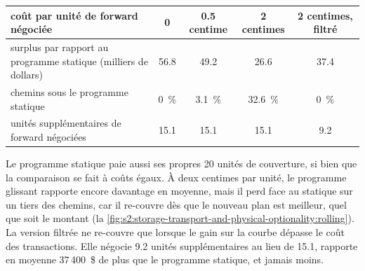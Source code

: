 \begin{center}
\small
\begin{tabular}{@{}p{5.6cm}cccc@{}}
\toprule
coût par unité de forward négociée & 0 & 0.5 centime & 2 centimes & 2 centimes, filtré\\
\midrule
surplus par rapport au programme statique (milliers de dollars) & 56.8 & 49.2 & 26.6 & 37.4\\
chemins sous le programme statique & 0~\% & 3.1~\% & 32.6~\% & 0~\%\\
unités supplémentaires de forward négociées & 15.1 & 15.1 & 15.1 & 9.2\\
\bottomrule
\end{tabular}
\end{center}

Le programme statique paie aussi ses propres 20 unités de couverture, si bien que la comparaison se fait à coûts égaux. À deux centimes par unité, le programme glissant
rapporte encore davantage en moyenne, mais il perd face au statique sur un tiers des chemins, car il re-couvre dès que le nouveau plan est meilleur, quel que soit le montant
(la \cref{fig:s2:storage-transport-and-physical-optionality:rolling}). La version filtrée ne re-couvre que lorsque le gain sur la courbe dépasse le coût des
transactions. Elle négocie 9.2 unités supplémentaires au lieu de 15.1, rapporte en moyenne 37\,400~\$ de plus que le programme statique, et jamais moins.

\begin{omfigure}

\label{fig:s2:storage-transport-and-physical-optionality:rolling}
\end{omfigure}

